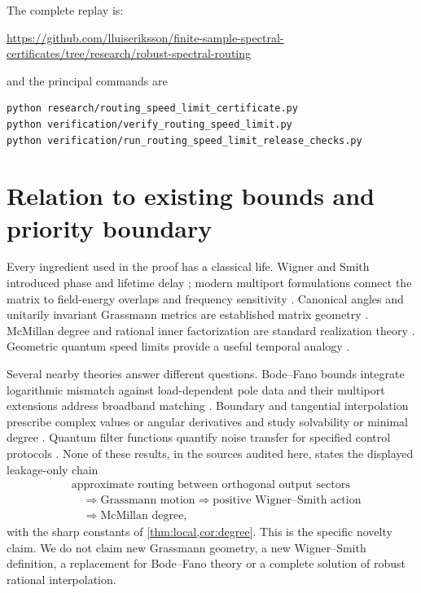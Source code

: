 \documentclass[11pt]{article}
\theoremstyle{definition}
\theoremstyle{remark}
\begin{document}
The complete replay is:
\begin{center}
\url{https://github.com/lluiseriksson/finite-sample-spectral-certificates/tree/research/robust-spectral-routing}
\end{center}
and the principal commands are
\begin{verbatim}
python research/routing_speed_limit_certificate.py
python verification/verify_routing_speed_limit.py
python verification/run_routing_speed_limit_release_checks.py
\end{verbatim}

\section{Relation to existing bounds and priority boundary}

Every ingredient used in the proof has a classical life.  Wigner and Smith
introduced phase and lifetime delay \cite{Wigner1955,Smith1960}; modern
multiport formulations connect the matrix to field-energy overlaps and
frequency sensitivity \cite{PatelMichielssen2021}.  Canonical angles and
unitarily invariant Grassmann metrics are established matrix geometry
\cite{QiuZhangLi2005,EdelmanAriasSmith1998}.  McMillan degree and rational
inner factorization are standard realization theory
\cite{McMillan1952,Potapov1955}.  Geometric quantum speed limits provide a
useful temporal analogy \cite{AnandanAharonov1990}.

Several nearby theories answer different questions.  Bode--Fano bounds
integrate logarithmic mismatch against load-dependent pole data and their
multiport extensions address broadband matching
\cite{Fano1950,Chen1989}.  Boundary and tangential interpolation prescribe
complex values or angular derivatives and study solvability or minimal
degree \cite{BallKang1990,BallBolotnikov2017,Bolotnikov2016}.  Quantum filter
functions quantify noise transfer for specified control protocols
\cite{CerfontaineEtAl2021}.  None of these results, in the sources audited
here, states the displayed leakage-only chain
\[
 \begin{aligned}
 &\text{approximate routing between orthogonal output sectors}\\
 &\quad\Longrightarrow\text{Grassmann motion}
 \Longrightarrow\text{positive Wigner--Smith action}\\
 &\quad\Longrightarrow\text{McMillan degree},
 \end{aligned}
\]
with the sharp constants of \cref{thm:local,cor:degree}.  This is the
specific novelty claim.  We do not claim new Grassmann geometry, a new
Wigner--Smith definition, a replacement for Bode--Fano theory or a complete
solution of robust rational interpolation.
\end{document}
